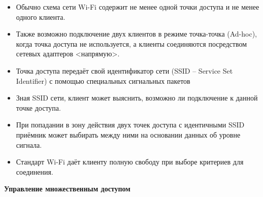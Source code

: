 \begin{itemize}
    \item Обычно схема сети Wi-Fi содержит не менее одной точки доступа и не менее одного клиента. 
    \item Также возможно подключение двух клиентов в режиме точка-точка (Ad-hoc), когда точка доступа не используется, а клиенты соединяются посредством сетевых адаптеров <напрямую>. 
    \item Точка доступа передаёт свой идентификатор сети (SSID -- Service Set Identifier) с помощью специальных сигнальных пакетов
    \item Зная SSID сети, клиент может выяснить, возможно ли подключение к данной точке доступа. 
    \item При попадании в зону действия двух точек доступа с идентичными SSID приёмник может выбирать между ними на основании данных об уровне сигнала. 
    \item Стандарт Wi-Fi даёт клиенту полную свободу при выборе критериев для соединения.
\end{itemize}

\textbf{\textbf{Управление множественным доступом}}


